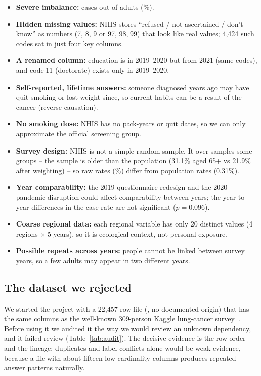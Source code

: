 \begin{itemize}
  \item \textbf{Severe imbalance:} \nCases cases out of \nAdults adults (\sampleRate\%).
  \item \textbf{Hidden missing values:} NHIS stores ``refused / not ascertained / don't know'' as numbers (7, 8, 9 or 97, 98, 99) that look like real values; 4,424 such codes sat in just four key columns.
  \item \textbf{A renamed column:} education is  in 2019--2020 but  from 2021 (same codes), and code 11 (doctorate) exists only in 2019--2020.
  \item \textbf{Self-reported, lifetime answers:} someone diagnosed years ago may have quit smoking or lost weight since, so current habits can be a result of the cancer (reverse causation).
  \item \textbf{No smoking dose:} NHIS has no pack-years or quit dates, so we can only approximate the official screening group.
  \item \textbf{Survey design:} NHIS is not a simple random sample. It over-samples some groups -- the sample is older than the population (31.1\% aged 65+ vs 21.9\% after weighting) -- so raw rates (\sampleRate\%) differ from population rates (0.31\%).
  \item \textbf{Year comparability:} the 2019 questionnaire redesign and the 2020 pandemic disruption could affect comparability between years; the year-to-year differences in the case rate are not significant ($p = 0.096$).
  \item \textbf{Coarse regional data:} each regional variable has only 20 distinct values (4 regions $\times$ 5 years), so it is ecological context, not personal exposure.
  \item \textbf{Possible repeats across years:} people cannot be linked between survey years, so a few adults may appear in two different years.
\end{itemize}

\subsection{The dataset we rejected}\label{sec:rejected}

We started the project with a 22,457-row file (, no documented origin) that has the same columns as the well-known 309-person Kaggle lung-cancer survey~\cite{kaggle}. Before using it we audited it the way we would review an unknown dependency, and it failed review (Table~\ref{tab:audit}). The decisive evidence is the row order and the lineage; duplicates and label conflicts alone would be weak evidence, because a file with about fifteen low-cardinality columns produces repeated answer patterns naturally.

